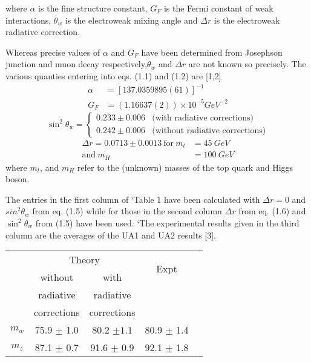where $\alpha$ is the fine structure constant, $G_{F}$ is the Fermi constant of weak interactions, $\theta_{w}$ is the electroweak mixing angle and $\Delta r$ is the electroweak radiative
correction. 

Whereas precise values of $\alpha$ and $G_{F}$ have been determined from Josephson
junction and muon decay respectively,$\theta_{w}$  and $\Delta r$ are not known so precisely.
The various quanties entering into eqs. (1.1) and (1.2) are [1,2] 
\begin{align}
\alpha &= [137.0359895(61)]^{-1}\tag{1.3}\\
G_{F} & = (1.16637(2)) \times 10^{-5} GeV^{-2}\tag{1.4}
\end{align}
\begin{equation*}
\sin^{2}\theta_{w}  =
\begin{cases}
0.233\pm 0.006 & \text{(with radiative corrections)} \\
0.242 \pm 0.006 & \text{(without radiative corrections)}\tag{1.5}
\end{cases}
\end{equation*}
\begin{align}
\Delta r = 0.0713 \pm 0.0013~ \text{for}~ m_{t} &= 45~ GeV\\
                      \text{and}~ m_{H} & = 100~ GeV\tag{1.6}
\end{align}
where $m_{t}$, and $m_{H}$ refer to the (unknown) masses of the top quark and Higgs boson. 

The entries in the first column of ‘Table 1 have been calculated with $\Delta r = 0$ and $sin^{2} \theta_{w}$ from eq. (1.5) while for those in the second column $\Delta r$ from eq. (1.6) and $\sin^{2} \theta_{w}$ from (1.5) have been used. ‘The experimental results given
in the third column are the averages of the UA1 and UA2 results [3]. 



\begin{center}
\renewcommand{\arraystretch}{1}
\begin{tabular}{|c|c|c|c|c|}
\hline
&\multicolumn{2}{c|}{Theory} &\multirow{2}{*}{Expt}\\
\cline{2-3}
& without&with &  \\
& radiative &radiative &  \\
& corrections &corrections&  \\
\hline
$m_{w}$ & 75.9 $\pm$ 1.0 & 80.2 $\pm 1.1$ & 80.9 $\pm$ 1.4 \\
$m_{z}$ & 87.1 $\pm$ 0.7 & 91.6 $\pm$ 0.9 & 92.1 $\pm$ 1.8 \\
\hline
\end{tabular}\\
{}
\end{center}


